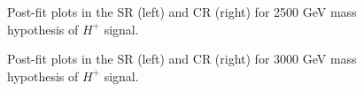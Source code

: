 \begin{figure}[H]
  \centering
  \caption{Post-fit plots in the SR (left) and CR (right) for 2500 GeV mass hypothesis of $H^{+}$ signal.}
  \label{fig:Postfit_Hp1000_Asimov}
\end{figure}
\begin{figure}[H]
  \centering
  \caption{Post-fit plots in the SR (left) and CR (right) for 3000 GeV mass hypothesis of $H^{+}$ signal.}
  \label{fig:Postfit_Hp1000_Asimov}
\end{figure}
